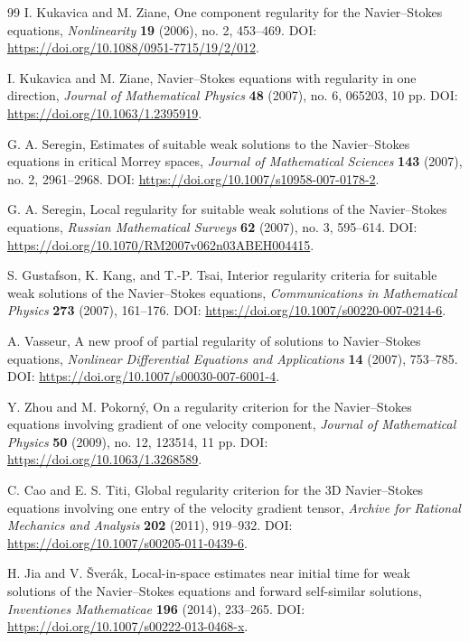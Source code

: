 \documentclass[pdflatex,sn-mathphys-num]{sn-jnl}
\numberwithin{equation}{section}
\theoremstyle{thmstyleone}
\theoremstyle{thmstylethree}
\begin{document}
\begin{thebibliography}{99}
	I. Kukavica and M. Ziane,
	One component regularity for the Navier--Stokes equations,
	\emph{Nonlinearity} \textbf{19} (2006), no. 2, 453--469.
	\newblock DOI: \url{https://doi.org/10.1088/0951-7715/19/2/012}.
	
	I. Kukavica and M. Ziane,
	Navier--Stokes equations with regularity in one direction,
	\emph{Journal of Mathematical Physics} \textbf{48} (2007), no. 6, 065203, 10 pp.
	\newblock DOI: \url{https://doi.org/10.1063/1.2395919}.
	
	G. A. Seregin,
	Estimates of suitable weak solutions to the Navier--Stokes equations in critical Morrey spaces,
	\emph{Journal of Mathematical Sciences} \textbf{143} (2007), no. 2, 2961--2968.
	\newblock DOI: \url{https://doi.org/10.1007/s10958-007-0178-2}.
	
	G. A. Seregin,
	Local regularity for suitable weak solutions of the Navier--Stokes equations,
	\emph{Russian Mathematical Surveys} \textbf{62} (2007), no. 3, 595--614.
	\newblock DOI: \url{https://doi.org/10.1070/RM2007v062n03ABEH004415}.
	
	S. Gustafson, K. Kang, and T.-P. Tsai,
	Interior regularity criteria for suitable weak solutions of the Navier--Stokes equations,
	\emph{Communications in Mathematical Physics} \textbf{273} (2007), 161--176.
	\newblock DOI: \url{https://doi.org/10.1007/s00220-007-0214-6}.
	
	A. Vasseur,
	A new proof of partial regularity of solutions to Navier--Stokes equations,
	\emph{Nonlinear Differential Equations and Applications} \textbf{14} (2007), 753--785.
	\newblock DOI: \url{https://doi.org/10.1007/s00030-007-6001-4}.
	
	Y. Zhou and M. Pokorn\'y,
	On a regularity criterion for the Navier--Stokes equations involving gradient of one velocity component,
	\emph{Journal of Mathematical Physics} \textbf{50} (2009), no. 12, 123514, 11 pp.
	\newblock DOI: \url{https://doi.org/10.1063/1.3268589}.
	
	C. Cao and E. S. Titi,
	Global regularity criterion for the 3D Navier--Stokes equations involving one entry of the velocity gradient tensor,
	\emph{Archive for Rational Mechanics and Analysis} \textbf{202} (2011), 919--932.
	\newblock DOI: \url{https://doi.org/10.1007/s00205-011-0439-6}.
	
	H. Jia and V. \v{S}ver\'ak,
	Local-in-space estimates near initial time for weak solutions of the Navier--Stokes equations and forward self-similar solutions,
	\emph{Inventiones Mathematicae} \textbf{196} (2014), 233--265.
	\newblock DOI: \url{https://doi.org/10.1007/s00222-013-0468-x}.
	

\end{thebibliography}
\end{document}
